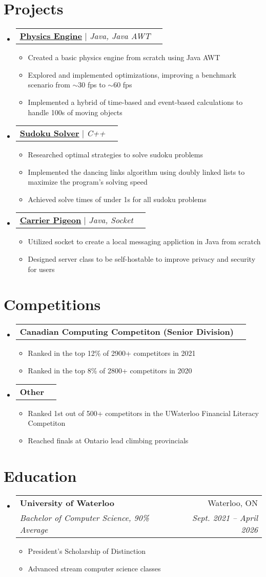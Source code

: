 \documentclass[letterpaper,11pt]{article}
\makeatletter
\newcommand{\resumeItem}[1]{
	\item\small{
		{#1 \vspace{-2pt}}
	}
}
\newcommand{\resumeSubheading}[4]{
	\vspace{-2pt}\item
		\begin{tabular*}{0.97\textwidth}[t]{l@{\extracolsep{\fill}}r}
			\textbf{#1} & #2 \\
			\textit{\small#3} & \textit{\small #4} \\
		\end{tabular*}\vspace{-7pt}
}
\newcommand{\resumeProjectHeading}[2]{
    \item
    \begin{tabular*}{0.97\textwidth}{l@{\extracolsep{\fill}}r}
      \small#1 & #2 \\
    \end{tabular*}\vspace{-7pt}
}
\newcommand{\resumeSubHeadingListStart}{\begin{itemize}[leftmargin=0.15in, label={}]}
\newcommand{\resumeSubHeadingListEnd}{\end{itemize}}
\newcommand{\resumeItemListStart}{\begin{itemize}}
\newcommand{\resumeItemListEnd}{\end{itemize}\vspace{-5pt}}
\makeatother
\begin{document}
\section{Projects}
\resumeSubHeadingListStart
	\resumeProjectHeading
	{\textbf{\href{https://github.com/Bro-Co/Physics-Engine}{\underline{Physics Engine}}} $|$ \emph{Java, Java AWT}}{} \resumeItemListStart
			\resumeItem{Created a basic physics engine from scratch using Java AWT}
			\resumeItem{Explored and implemented optimizations, improving a benchmark scenario from $\sim$30 fps to $\sim$60 fps}
			\resumeItem{Implemented a hybrid of time-based and event-based calculations to handle 100s of moving objects}
		\resumeItemListEnd
	\resumeProjectHeading
		{\textbf{\href{https://github.com/smchase/ICS201/tree/master/SUDOKU}{\underline{Sudoku Solver}}} $|$ \emph{C++}}{}
		\resumeItemListStart
			\resumeItem{Researched optimal strategies to solve sudoku problems}
			\resumeItem{Implemented the dancing links algorithm using doubly linked lists to maximize the program's solving speed}
			\resumeItem{Achieved solve times of under 1s for all sudoku problems}
		\resumeItemListEnd
	\resumeProjectHeading
		{\textbf{\href{https://github.com/smchase/Carrier-Pigeon}{\underline{Carrier Pigeon}}} $|$ \emph{Java, Socket}}{}
		\resumeItemListStart
			\resumeItem{Utilized socket to create a local messaging appliction in Java from scratch}
			\resumeItem{Designed server class to be self-hostable to improve privacy and security for users}
		\resumeItemListEnd
\resumeSubHeadingListEnd


\section{Competitions}
\resumeSubHeadingListStart
	\resumeProjectHeading
		{\textbf{Canadian Computing Competiton (Senior Division)}}{}
		\resumeItemListStart
			\resumeItem{Ranked in the top 12\% of 2900+ competitors in 2021}
			\resumeItem{Ranked in the top 8\% of 2800+ competitors in 2020}
		\resumeItemListEnd
	\resumeProjectHeading
		{\textbf{Other}}{}
		\resumeItemListStart
			\resumeItem{Ranked 1st out of 500+ competitors in the UWaterloo Financial Literacy Competiton}
			\resumeItem{Reached finals at Ontario lead climbing provincials}
		\resumeItemListEnd
\resumeSubHeadingListEnd


\section{Education}
\resumeSubHeadingListStart
	\resumeSubheading
		{University of Waterloo}{Waterloo, ON}
		{Bachelor of Computer Science, 90\% Average}{Sept. 2021 -- April 2026}
	\resumeItemListStart
		\resumeItem{President's Scholarship of Distinction}
		\resumeItem{Advanced stream computer science classes}
	\resumeItemListEnd
\resumeSubHeadingListEnd
\end{document}
